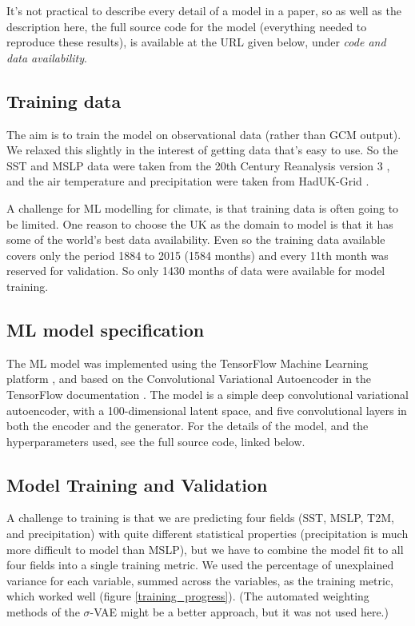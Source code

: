 \documentclass[gmd,manuscript]{copernicus}
\begin{document}
It's not practical to describe every detail of a model in a paper, so as well as the description here, the full source code for the model (everything needed to reproduce these results), is available at the URL given below, under {\it code and data availability}.

\subsection{Training data}

The aim is to train the model on observational data (rather than GCM output). We relaxed this slightly in the interest of getting data that's easy to use. So the SST and MSLP data were taken from the 20th Century Reanalysis version 3 \citep{slivinski_20crv3.1}, and the air temperature and precipitation
were taken from HadUK-Grid \citep{HadUK-Grid}.

A challenge for ML modelling for climate, is that training data is often going to be limited. One reason to choose the UK as the domain to model is that it has some of the world's best data availability. Even so the training data available covers only the period 1884 to 2015 (1584 months) and every 11th month was reserved for validation. So only 1430 months of data were available for model training.

\subsection{ML model specification}

The ML model was implemented using the TensorFlow Machine Learning platform \citep{tensorflow2015-whitepaper}, and based on the Convolutional Variational Autoencoder in the TensorFlow documentation \citep{TF_CVAE}. The model is a simple deep convolutional variational autoencoder, with a 100-dimensional latent space, and five convolutional layers in both the encoder and the generator. For the details of the model, and the hyperparameters used, see the full source code, linked below.

\subsection{Model Training and Validation}

A challenge to training is that we are predicting four fields (SST, MSLP, T2M, and precipitation) with quite different statistical properties (precipitation is much more difficult to model than MSLP), but we have to combine the model fit to all four fields into a single training metric. We used the percentage of unexplained variance for each variable, summed across the variables, as the training metric, which worked well (figure \ref{training_progress}). (The automated weighting methods of the $\sigma$-VAE \citep{sigma-VAE} might be a better approach, but it was not used here.)
\end{document}
